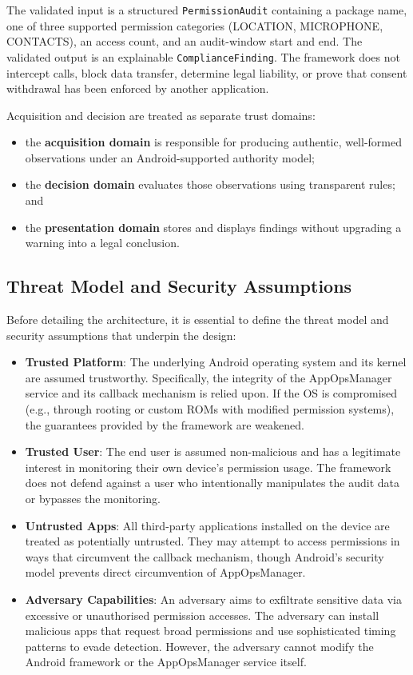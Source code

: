 The validated input is a structured \texttt{PermissionAudit} containing a package name, one of three supported permission categories (LOCATION, MICROPHONE, CONTACTS), an access count, and an audit-window start and end. The validated output is an explainable \texttt{ComplianceFinding}. The framework does not intercept calls, block data transfer, determine legal liability, or prove that consent withdrawal has been enforced by another application.

Acquisition and decision are treated as separate trust domains:
\begin{itemize}
\item the \textbf{acquisition domain} is responsible for producing authentic, well-formed observations under an Android-supported authority model;
\item the \textbf{decision domain} evaluates those observations using transparent rules; and
\item the \textbf{presentation domain} stores and displays findings without upgrading a warning into a legal conclusion.
\end{itemize}

\subsection{Threat Model and Security Assumptions}

Before detailing the architecture, it is essential to define the threat model and security assumptions that underpin the design:

\begin{itemize}
\item \textbf{Trusted Platform}: The underlying Android operating system and its kernel are assumed trustworthy. Specifically, the integrity of the AppOpsManager service and its callback mechanism is relied upon. If the OS is compromised (e.g., through rooting or custom ROMs with modified permission systems), the guarantees provided by the framework are weakened.
\item \textbf{Trusted User}: The end user is assumed non-malicious and has a legitimate interest in monitoring their own device's permission usage. The framework does not defend against a user who intentionally manipulates the audit data or bypasses the monitoring.
\item \textbf{Untrusted Apps}: All third-party applications installed on the device are treated as potentially untrusted. They may attempt to access permissions in ways that circumvent the callback mechanism, though Android's security model prevents direct circumvention of AppOpsManager.
\item \textbf{Adversary Capabilities}: An adversary aims to exfiltrate sensitive data via excessive or unauthorised permission accesses. The adversary can install malicious apps that request broad permissions and use sophisticated timing patterns to evade detection. However, the adversary cannot modify the Android framework or the AppOpsManager service itself.
\end{itemize}

